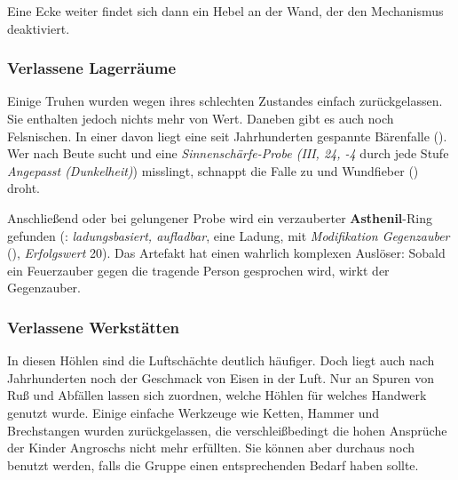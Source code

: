 \spaltenende


\spaltenanfang

Eine Ecke weiter findet sich dann ein Hebel an der Wand, der den Mechanismus deaktiviert.


\subsubsection{Verlassene Lagerräume}
Einige Truhen wurden wegen ihres schlechten Zustandes einfach zurückgelassen. 
Sie enthalten jedoch nichts mehr von Wert.
Daneben gibt es auch noch Felsnischen.
In einer davon liegt eine seit Jahrhunderten gespannte Bärenfalle ().
Wer nach Beute sucht und eine \emph{Sinnenschärfe-Probe (III, 24, -4} durch jede Stufe \emph{Angepasst (Dunkelheit)}) misslingt, schnappt die Falle zu und Wundfieber () droht.

Anschließend oder bei gelungener Probe wird ein verzauberter \textbf{Asthenil}-Ring gefunden (: \emph{ladungsbasiert, aufladbar}, eine Ladung,  mit \emph{Modifikation Gegenzauber} (), \emph{Erfolgswert} 20).
Das Artefakt hat einen wahrlich komplexen Auslöser:
Sobald ein Feuerzauber gegen die tragende Person gesprochen wird, wirkt der Gegenzauber.

\subsubsection{Verlassene Werkstätten}
In diesen Höhlen sind die Luftschächte deutlich häufiger. Doch liegt auch nach Jahrhunderten noch der Geschmack von Eisen in der Luft.
Nur an Spuren von Ruß und Abfällen lassen sich zuordnen, welche Höhlen für welches Handwerk genutzt wurde.
Einige einfache Werkzeuge wie Ketten, Hammer und Brechstangen wurden zurückgelassen, die verschleißbedingt die hohen Ansprüche der Kinder Angroschs nicht mehr erfüllten. Sie können aber durchaus noch benutzt werden, falls die Gruppe einen entsprechenden Bedarf haben sollte.

